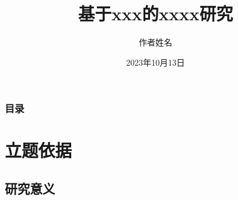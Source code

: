 \documentclass{beamer}
\title{基于xxx的xxxx研究}
\author{作者姓名}
\institute[] %
{
广东省xxx中心\\
xxxx重点实验室\\
  华南理工大学
	\and
}
\date{2023年10月13日}
\theoremstyle{remark}
\begin{document}
\LogoOff  %

\begin{frame}
\titlepage
\end{frame}
\LogoOn %

\begin{frame}
\frametitle{目录}
\tableofcontents
\end{frame}

\section{立题依据}

\subsection{研究意义}
\end{document}
